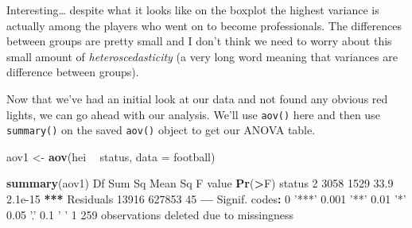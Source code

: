 \documentclass[
]{book}
\newenvironment{Shaded}{\begin{snugshade}}{\end{snugshade}}
\newcommand{\ControlFlowTok}[1]{\textcolor[rgb]{0.13,0.29,0.53}{\textbf{#1}}}
\newcommand{\DataTypeTok}[1]{\textcolor[rgb]{0.13,0.29,0.53}{#1}}
\newcommand{\DecValTok}[1]{\textcolor[rgb]{0.00,0.00,0.81}{#1}}
\newcommand{\ErrorTok}[1]{\textcolor[rgb]{0.64,0.00,0.00}{\textbf{#1}}}
\newcommand{\FloatTok}[1]{\textcolor[rgb]{0.00,0.00,0.81}{#1}}
\newcommand{\KeywordTok}[1]{\textcolor[rgb]{0.13,0.29,0.53}{\textbf{#1}}}
\newcommand{\NormalTok}[1]{#1}
\newcommand{\OperatorTok}[1]{\textcolor[rgb]{0.81,0.36,0.00}{\textbf{#1}}}
\newcommand{\OtherTok}[1]{\textcolor[rgb]{0.56,0.35,0.01}{#1}}
\newcommand{\StringTok}[1]{\textcolor[rgb]{0.31,0.60,0.02}{#1}}
\begin{document}
\begin{Shaded}
\end{Shaded}

Interesting\ldots{} despite what it looks like on the boxplot the highest variance is actually among the players who went on to become professionals. The differences between groups are pretty small and I don't think we need to worry about this small amount of \emph{heteroscedasticity} (a very long word meaning that variances are difference between groups).

Now that we've had an initial look at our data and not found any obvious red lights, we can go ahead with our analysis. We'll use \texttt{aov()} here and then use \texttt{summary()} on the saved \texttt{aov()} object to get our ANOVA table.

\begin{Shaded}
\begin{Highlighting}[]
\NormalTok{aov1 <-}\StringTok{ }\KeywordTok{aov}\NormalTok{(hei }\OperatorTok{~}\StringTok{ }\NormalTok{status, }\DataTypeTok{data =}\NormalTok{ football)}

\KeywordTok{summary}\NormalTok{(aov1)}
\NormalTok{               Df Sum Sq Mean Sq F value  }\KeywordTok{Pr}\NormalTok{(}\OperatorTok{>}\NormalTok{F)    }
\NormalTok{status          }\DecValTok{2}   \DecValTok{3058}    \DecValTok{1529}    \FloatTok{33.9} \FloatTok{2.1e-15} \OperatorTok{**}\ErrorTok{*}
\NormalTok{Residuals   }\DecValTok{13916} \DecValTok{627853}      \DecValTok{45}                    
\OperatorTok{---}
\NormalTok{Signif. codes}\OperatorTok{:}\StringTok{  }\DecValTok{0} \StringTok{'***'} \FloatTok{0.001} \StringTok{'**'} \FloatTok{0.01} \StringTok{'*'} \FloatTok{0.05} \StringTok{'.'} \FloatTok{0.1} \StringTok{' '} \DecValTok{1}
\DecValTok{259}\NormalTok{ observations deleted due to missingness}
\end{Highlighting}
\end{Shaded}
\end{document}
